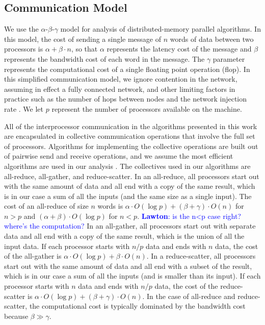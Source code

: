 \documentclass[conference,compsoc]{IEEEtran}
\newcommand{\LM}[1]{\textcolor{blue}{\textbf{Lawton}: #1}}
\begin{document}
\subsection{Communication Model}

We use the $\alpha$-$\beta$-$\gamma$ model \cite{TRG05,CH+07,BCDH+14} for analysis of distributed-memory parallel algorithms. 
In this model, the cost of sending a single message of $n$ words of data between two processors is $\alpha + \beta \cdot n$, so that $\alpha$ represents the latency cost of the message and $\beta$ represents the bandwidth cost of each word in the message.
The $\gamma$ parameter represents the computational cost of a single floating point operation (flop).
In this simplified communication model, we ignore contention in the network, assuming in effect a fully connected network, and other limiting factors in practice such as the number of hops between nodes and the network injection rate \cite{GOS16}.
We let $p$ represent the number of processors available on the machine.

All of the interprocessor communication in the algorithms presented in this work are encapsulated in collective communication operations that involve the full set of processors.
Algorithms for implementing the collective operations are built out of pairwise send and receive operations, and we assume the most efficient algorithms are used in our analysis \cite{TRG05,CH+07}.
The collectives used in our algorithms are all-reduce, all-gather, and reduce-scatter.
In an all-reduce, all processors start out with the same amount of data and all end with a copy of the same result, which is in our case a sum of all the inputs (and the same size as a single input).
The cost of an all-reduce of size $n$ words is $\alpha \cdot O(\log p) + (\beta+\gamma) \cdot O(n)$ for $n>p$ and $(\alpha+\beta) \cdot O(\log p)$ for $n<p$. \LM{is the n<p case right? where's the computation?}
In an all-gather, all processors start out with separate data and all end with a copy of the same result, which is the union of all the input data.
If each processor starts with $n/p$ data and ends with $n$ data, the cost of the all-gather is $\alpha \cdot O(\log p) + \beta \cdot O(n)$.
In a reduce-scatter, all processors start out with the same amount of data and all end with a subset of the result, which is in our case a sum of all the inputs (and is smaller than its input).
If each processor starts with $n$ data and ends with $n/p$ data, the cost of the reduce-scatter is $\alpha \cdot O(\log p) + (\beta+\gamma) \cdot O(n)$.
In the case of all-reduce and reduce-scatter, the computational cost is typically dominated by the bandwidth cost because $\beta \gg \gamma$.
\end{document}
